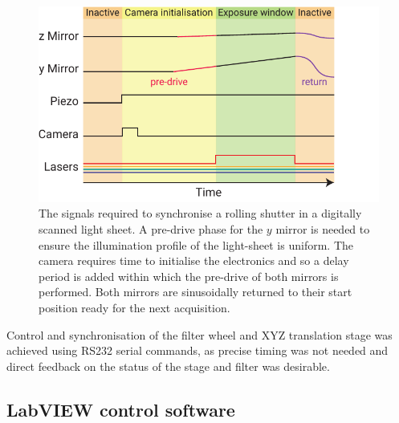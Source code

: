 \begin{figure}
  \centering
  \includegraphics{slit_signals}
  \caption[The signals required to synchronise a rolling shutter in a digitally scanned light sheet]{
  The signals required to synchronise a rolling shutter in a digitally scanned light sheet.
  A pre-drive phase for the \(y\) mirror is needed to ensure the illumination profile of the light-sheet is uniform.
  The camera requires time to initialise the electronics and so a delay period is added within which the pre-drive of both mirrors is performed.
  Both mirrors are sinusoidally returned to their start position ready for the next acquisition.
  }\label{fig:slit_signals}
\end{figure}

Control and synchronisation of the filter wheel and XYZ translation stage was achieved using \gls{RS232} serial commands, as precise timing was not needed and direct feedback on the status of the stage and filter was desirable. %

%



\subsection{\gls{LabVIEW} control software}

